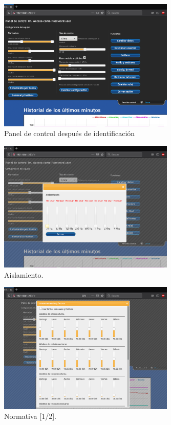 \begin{figure}[ht]
    \centering
    \includegraphics[width=0.75\textwidth]{imagenes/interfaz/Interfaz_2_menu_acceso.png}
    \caption{Panel de control después de identificación}
\end{figure}

\begin{figure}[ht]
    \centering
    \includegraphics[width=0.75\textwidth]{imagenes/interfaz/Interfaz_3_aislamiento.png}
    \caption{Aislamiento.}
\end{figure}

\begin{figure}[ht]
    \centering
    \includegraphics[width=0.75\textwidth]{imagenes/interfaz/Interfaz_4_festivos_0.png}
    \caption{Normativa [1/2].}
\end{figure}

